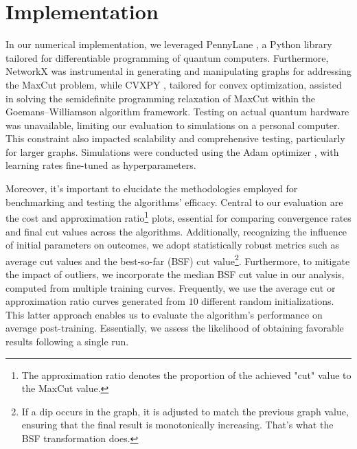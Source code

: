 \section{Implementation}
\label{sec:resul}

In our numerical implementation, we leveraged PennyLane \cite{Pennylane}, a Python library tailored for differentiable programming of quantum computers. Furthermore, NetworkX \cite{NetworkX} was instrumental in generating and manipulating graphs for addressing the MaxCut problem, while CVXPY \cite{cvxpy}, tailored for convex optimization, assisted in solving the semidefinite programming relaxation of MaxCut within the Goemans–Williamson algorithm framework. Testing on actual quantum hardware was unavailable, limiting our evaluation to simulations on a personal computer. This constraint also impacted scalability and comprehensive testing, particularly for larger graphs. Simulations were conducted using the Adam optimizer \cite{kingma2017adam}, with learning rates fine-tuned as hyperparameters.


Moreover, it's important to elucidate the methodologies employed for benchmarking and testing the algorithms' efficacy. Central to our evaluation are the cost and approximation ratio\footnote{The approximation ratio denotes the proportion of the achieved "cut" value to the MaxCut value.} plots, essential for comparing convergence rates and final cut values across the algorithms. Additionally, recognizing the influence of initial parameters on outcomes, we adopt statistically robust metrics such as average cut values and the best-so-far (BSF) cut value\footnote{If a dip occurs in the graph, it is adjusted to match the previous graph value, ensuring that the final result is monotonically increasing. That's what the BSF transformation does.}. Furthermore, to mitigate the impact of outliers, we incorporate the median BSF cut value in our analysis, computed from multiple training curves. Frequently, we use the average cut or approximation ratio curves generated from $10$ different random initializations. This latter approach enables us to evaluate the algorithm's performance on average post-training. Essentially, we assess the likelihood of obtaining favorable results following a single run.

